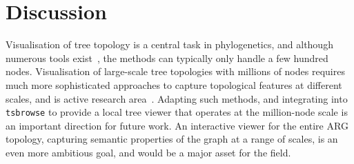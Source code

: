 \documentclass[unnumsec,webpdf,contemporary,large,namedate]{oup-authoring-template}%
\begin{document}

\section{Discussion} \label{sec:Discussion} 
Visualisation of tree topology is a central task in phylogenetics, 
and although numerous tools
exist~\citep[e.g.][]{huson2007dendroscope,vaughan2017icytree},
the methods can typically only handle a few hundred nodes.
Visualisation of large-scale tree topologies with millions of nodes
requires much more sophisticated approaches
to capture topological features at different scales, 
and is active research area~\citep{wong2022dynamic,kramer2023treenome}.
Adapting such methods, and integrating into \texttt{tsbrowse} to provide
a local tree viewer that operates at the million-node scale
is an important direction for future work.
An interactive viewer for the entire ARG topology, capturing 
semantic properties of the graph at a range of scales, is an even more 
ambitious goal, and would be a major asset for the field.

\end{document}
